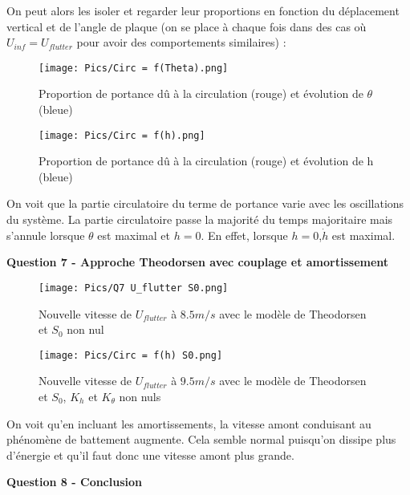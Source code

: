 \documentclass[conference]{IEEEtran}
\begin{document}
On peut alors les isoler et regarder leur proportions en fonction du déplacement vertical et de l'angle de plaque (on se place à chaque fois dans des cas où $U_{inf} = U_{flutter}$ pour avoir des comportements similaires) : 

\begin{figure}[H]
  \texttt{[image: Pics/Circ = f(Theta).png]}
  \caption{Proportion de portance dû à la circulation (rouge) et évolution de $\theta$ (bleue) }
  \label{fig:boat1}
\end{figure}

\begin{figure}[H]
  \texttt{[image: Pics/Circ = f(h).png]}
  \caption{ Proportion de portance dû à la circulation (rouge) et évolution de h (bleue)}
  \label{fig:boat1}
\end{figure}

On voit que la partie circulatoire du terme de portance varie avec les oscillations du système. La partie circulatoire passe la majorité du temps majoritaire mais s'annule lorsque $\theta$ est maximal et $h = 0$. En effet, lorsque $h = 0$,$\dot h$ est maximal. 

\textbf{Question 7 - Approche Theodorsen avec couplage et amortissement }

\begin{figure}[H]
  \texttt{[image: Pics/Q7 U\_flutter S0.png]}
  \caption{Nouvelle vitesse de $U_{flutter}$ à $8.5m/s$ avec le modèle de Theodorsen et $S_{0}$ non nul}
  \label{fig:boat1}
\end{figure}

\hfill

\begin{figure}[H]
  \texttt{[image: Pics/Circ = f(h) S0.png]}
  \caption{Nouvelle vitesse de $U_{flutter}$ à $9.5m/s$ avec le modèle de Theodorsen et $S_{0}$, $K_{h}$ et $K_{\theta}$ non nuls}
  \label{fig:boat1}
\end{figure}

On voit qu'en incluant les amortissements, la vitesse amont conduisant au phénomène de battement augmente. Cela semble normal puisqu'on dissipe plus d'énergie et qu'il faut donc une vitesse amont plus grande. 


\textbf{Question 8 - Conclusion }
\end{document}
